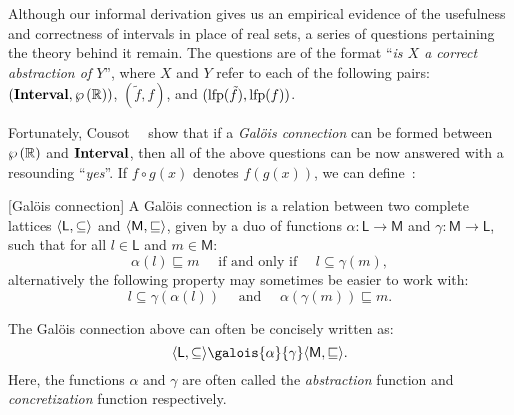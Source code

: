 Although our informal derivation gives us an empirical evidence of the
usefulness and correctness of intervals in place of real sets, a series of
questions pertaining the theory behind it remain.  The questions are of the
format ``\emph{is $X$ a correct abstraction of $Y$}'', where $X$ and $Y$
refer to each of the following pairs: $(\mathbf{Interval}, \wp\left({\mathbb{R}}\right))$,
$(\tilde{f}, f)$, and $(\operatorname{\mathrm{lfp}} (\tilde{f}), \operatorname{\mathrm{lfp}} (f))$.

Fortunately, Cousot~\etal~\cite{cousot77} show that if a \emph{Gal\"ois
connection} can be formed between $\wp\left({\mathbb{R}}\right)$ and $\mathbf{Interval}$,
then all of the above questions can be now answered with a resounding
``\emph{yes}''.  If $f \circ g (x)$ denotes $f(g(x))$, we can
define~\cite{nielson99}:
\begin{definition}
    \textup{[Gal\"ois connection]}
    A Gal\"ois connection is a relation between two complete lattices
    $\langle{\mathsf{L}}, {\subseteq}\rangle$ and $\langle{\mathsf{M}}, {\sqsubseteq}\rangle$,
    given by a duo of functions $\alpha: \mathsf{L} \to \mathsf{M}$ and
    $\gamma: \mathsf{M} \to \mathsf{L}$, such that for all $l \in \mathsf{L}$
    and $m \in \mathsf{M}$:
    \begin{equation}
        \alpha (l) \sqsubseteq m
        \quad
        \text{~if and only if~}
        \quad
        l \subseteq \gamma (m),
        \label{bg:eq:galois}
    \end{equation}
    alternatively the following property may sometimes be easier to work with:
    \begin{equation}
        l \subseteq \gamma(\alpha(l))
        \quad
        \text{~and~}
        \quad
        \alpha(\gamma(m)) \sqsubseteq m.
        \label{bg:eq:galois}
    \end{equation}
\end{definition}\vspace{-16.5pt}
The Gal\"ois connection above can often be concisely written as:
\begin{equation}
    \lattice{\mathsf{L}}{\subseteq}
        \galois{\alpha}{\gamma}
    \lattice{\mathsf{M}}{\sqsubseteq}.
\end{equation}
Here, the functions $\alpha$ and $\gamma$ are often called the
\emph{abstraction} function and \emph{concretization} function respectively.

